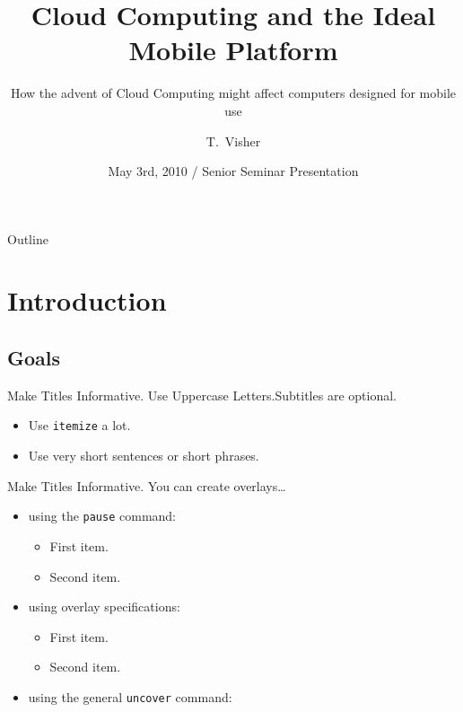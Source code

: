 \documentclass{beamer}
\title{Cloud Computing and the Ideal Mobile Platform}
\subtitle{How the advent of Cloud Computing might affect computers designed for
  mobile use}
\author{T.~Visher}
\institute[Chestnut Hill College]{Department of Computer Science\\
  Chestnut Hill College}
\date[Senior Seminar]{May 3rd, 2010 / Senior Seminar Presentation}
\begin{document}
\begin{frame}
\titlepage
\end{frame}

\begin{frame}{Outline}
\tableofcontents
\end{frame}



\section{Introduction}

\subsection{Goals}

\begin{frame}{Make Titles Informative. Use Uppercase Letters.}{Subtitles are optional.}

\begin{itemize}
  \item Use \texttt{itemize} a lot.
  \item Use very short sentences or short phrases.
\end{itemize}

\end{frame}

\begin{frame}{Make Titles Informative.}
You can create overlays\dots
\begin{itemize}
  \item using the \texttt{pause} command:
    \begin{itemize}
      \item First item. \pause
      \item Second item.
    \end{itemize}
  \item using overlay specifications:
    \begin{itemize}
      \item<3-> First item.
      \item<4-> Second item.
    \end{itemize}
  \item using the general \texttt{uncover} command:
    \begin{itemize}
    \end{itemize}
\end{itemize}
\end{frame}
\end{document}
